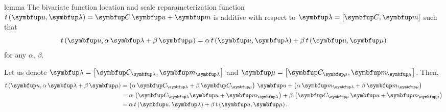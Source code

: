 

\begin{theoremEnd}{lemma}\label{thm:additive}
  The bivariate function location and scale reparameterization function
  \(
    t\left(\vu, \vlambda\right) = \mC\,\vu + \vm
  \)
  is additive with respect to \(\vlambda =\left[\mC, \vm\right]\) such that
  \[
    t\left(\vu, \alpha\,\vlambda + \beta\,\vmu\right) 
    = \alpha\,t\left(\vu, \vlambda\right) + \beta\,t\left(\vu, \vmu\right)
  \]
  for any \(\alpha\), \(\beta\).
\end{theoremEnd}
\begin{proofEnd}
  Let us denote \(\vlambda =\left[\mC_{\vlambda}, \vm_{\vlambda}\right]\) and \(\vmu = \left[\mC_{\vmu}, \vm_{\vmu}\right]\).
  Then,
  \begin{alignat}{2}
    t\left(\vu, \alpha\,\vlambda + \beta\,\vmu\right) 
    &= 
    \left(\alpha\,\mC_{\vlambda} + \beta\,\mC_{\vmu}\right)\,\vu + \left(\alpha\,\vm_{\vlambda} + \beta\,\vm_{\vmu}\right)
    \nonumber
    \\
    &= 
    \alpha\,\left(\mC_{\vlambda}\vu + \vm_{\vlambda}\right) + \beta\,\left(\mC_{\vmu}\,\vu + \vm_{\vmu}\right)
    \nonumber
    \\
    &= 
    \alpha\,t\left(\vu, \vlambda\right) + \beta\,t\left(\vu, \vmu\right).
    \nonumber
  \end{alignat}
\end{proofEnd}

